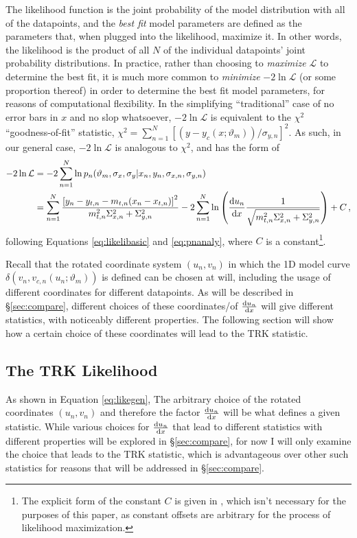 The likelihood function is the joint probability of the model distribution with all of the datapoints, and the \textit{best fit} model parameters are defined as the parameters that, when plugged into the likelihood, maximize it. In other words, the likelihood is the product of all $N$ of the individual datapoints' joint probability distributions. In practice, rather than choosing to \textit{maximize} $\mathcal{L}$ to determine the best fit, it is much more common to \textit{minimize} $-2\ln\mathcal{L}$ (or some proportion thereof) in order to determine the best fit model parameters, for reasons of computational flexibility. In the simplifying ``traditional'' case of no error bars in $x$ and no slop whatsoever, $-2\ln\mathcal{L}$ is equivalent to the $\chi^2$ ``goodness-of-fit'' statistic, $\chi^2=\sum\limits_{n=1}^N\left[(y - y_c(x;\vartheta_m))/\sigma_{y,n}\right]^2$. As such, in our general case, $-2\ln\mathcal{L}$ is analogous to $\chi^2$, and has the form of
\begin{align}\label{eq:likegen}
-2\ln\mathcal{L} &= -2\sum_{n=1}^{N}{\ln p_n(\vartheta_m,\sigma_x,\sigma_y|x_n,y_n,\sigma_{x,n},\sigma_{y,n})} \nonumber \\
&=\sum_{n=1}^{N}\frac{\left[y_n-y_{t,n}-m_{t,n}(x_n-x_{t,n})\right]^2}{m_{t,n}^2\Sigma_{x,n}^2+\Sigma_{y,n}^2} -2\sum_{n=1}^{N}\ln\left(\dv{u_n}{x}\frac{1}{\sqrt{m_{t,n}^2\Sigma_{x,n}^2+\Sigma_{y,n}^2}}\right) + C \, ,
\end{align}
following Equations \eqref{eq:likelibasic} and \eqref{eq:pnanaly}, where $C$ is a constant\footnote{The explicit form of the constant $C$ is given in \textcite{trotter}, which isn't necessary for the purposes of this paper, as constant offsets are arbitrary for the process of likelihood maximization.}.

Recall that the rotated coordinate system $(u_n, v_n)$ in which the 1D model curve $\delta(v_n, v_{c,n}(u_n;\vartheta_m))$ is defined can be chosen at will, including the usage of different coordinates for different datapoints. As will be described in \S\ref{sec:compare}, different choices of these coordinates/of $\dv{u_n}{x}$ will give different statistics, with noticeably different properties. The following section will show how a certain choice of these coordinates will lead to the TRK statistic.

\subsection{The TRK Likelihood}
\label{sec:likelihood}
As shown in Equation \eqref{eq:likegen}, The arbitrary choice of the rotated coordinates $(u_n,v_n)$ and therefore the factor $\dv{u_n}{x}$ will be what defines a given statistic. While various choices for $\dv{u_n}{x}$ that lead to different statistics with different properties will be explored in \S\ref{sec:compare}, for now I will only examine the choice that leads to the TRK statistic, which is advantageous over other such statistics for reasons that will be addressed in \S\ref{sec:compare}.

